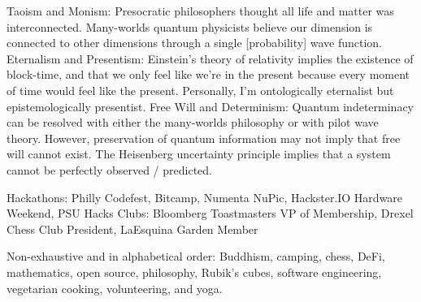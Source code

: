 \documentclass[10pt,a4paper]{article} %
\begin{document}
\inlineheadsection
{Taoism and Monism:}
{Presocratic philosophers thought all life and matter was interconnected. Many-worlds quantum physicists believe our dimension is connected to other dimensions through a single [probability] wave function.}
\inlineheadsection
{Eternalism and Presentism:}
{Einstein's theory of relativity implies the existence of block-time, and that we only feel like we're in the present because every moment of time would feel like the present. Personally, I'm ontologically eternalist but epistemologically presentist.}
\inlineheadsection
{Free Will and Determinism:}
{Quantum indeterminacy can be resolved with either the many-worlds philosophy or with pilot wave theory. However, preservation of quantum information may not imply that free will cannot exist. The Heisenberg uncertainty principle implies that a system cannot be perfectly observed / predicted.}



\spacedhrule{1.6em}{-0.4em} %



\inlineheadsection %
{Hackathons:}
{Philly Codefest, Bitcamp, Numenta NuPic, Hackster.IO Hardware Weekend, PSU Hacks}
\inlineheadsection %
{Clubs:}
{Bloomberg Toastmasters VP of Membership, Drexel Chess Club President, LaEsquina Garden Member}


\inlineheadsection %
{Non-exhaustive and in alphabetical order:}
{Buddhism, camping, chess, DeFi, mathematics, open source, philosophy, Rubik's cubes, software engineering, vegetarian cooking, volunteering, and yoga.}

\end{document}
